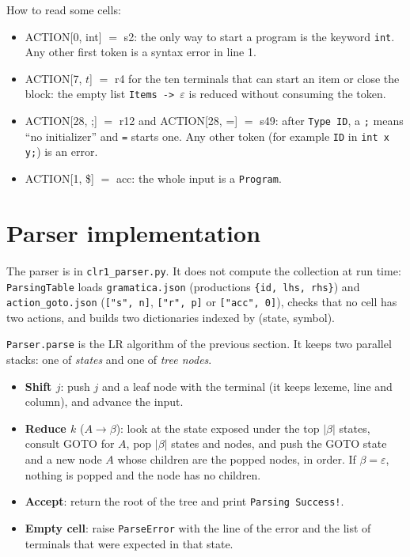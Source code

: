 \documentclass[11pt,letterpaper]{article}
\let\oldsection\section
\renewcommand{\section}{\needspace{8\baselineskip}\oldsection}
\newcommand{\tok}[1]{\texttt{#1}}
\newcommand{\ok}[1]{\textcolor{okgreen}{\texttt{#1}}}
\begin{document}
How to read some cells:
\begin{itemize}
  \item ACTION[0, int] $=$ s2: the only way to start a program is the keyword
        \tok{int}. Any other first token is a syntax error in line 1.
  \item ACTION[7, $t$] $=$ r4 for the ten terminals that can start an item
        or close the block: the empty list \texttt{Items -> $\varepsilon$} is
        reduced without consuming the token.
  \item ACTION[28, ;] $=$ r12 and ACTION[28, =] $=$ s49: after
        \texttt{Type ID}, a \tok{;} means ``no initializer'' and \tok{=}
        starts one. Any other token (for example \tok{ID} in
        \texttt{int x y;}) is an error.
  \item ACTION[1, \$] $=$ acc: the whole input is a \texttt{Program}.
\end{itemize}

\section{Parser implementation}

The parser is in \texttt{clr1\_parser.py}. It does not compute the collection
at run time: \texttt{ParsingTable} loads \texttt{gramatica.json} (productions
\texttt{\{id, lhs, rhs\}}) and \texttt{action\_goto.json} (\texttt{["s", n]},
\texttt{["r", p]} or \texttt{["acc", 0]}), checks that no cell has two
actions, and builds two dictionaries indexed by (state, symbol).

\texttt{Parser.parse} is the LR algorithm of the previous section. It keeps
two parallel stacks: one of \emph{states} and one of \emph{tree nodes}.

\begin{itemize}
  \item \textbf{Shift $j$}: push $j$ and a leaf node with the terminal (it
        keeps lexeme, line and column), and advance the input.
  \item \textbf{Reduce $k$} ($A\to\beta$): look at the state exposed under
        the top $|\beta|$ states, consult GOTO for $A$, pop $|\beta|$ states
        and nodes, and push the GOTO state and a new node $A$ whose children
        are the popped nodes, in order. If $\beta=\varepsilon$, nothing is
        popped and the node has no children.
  \item \textbf{Accept}: return the root of the tree and print
        \ok{Parsing Success!}.
  \item \textbf{Empty cell}: raise \texttt{ParseError} with the line of the
        error and the list of terminals that were expected in that state.
\end{itemize}
\end{document}
